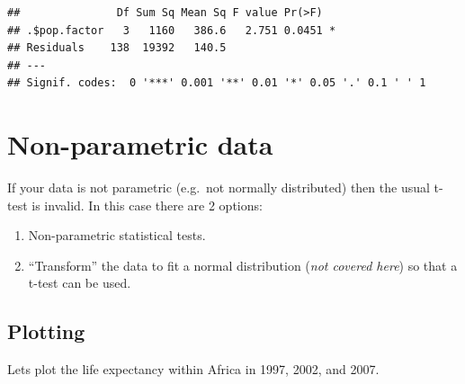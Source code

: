 \documentclass[]{book}
\makeatletter
\newenvironment{Shaded}{\begin{snugshade}}{\end{snugshade}}
\newcommand{\KeywordTok}[1]{\textcolor[rgb]{0.13,0.29,0.53}{\textbf{#1}}}
\newcommand{\DataTypeTok}[1]{\textcolor[rgb]{0.13,0.29,0.53}{#1}}
\newcommand{\DecValTok}[1]{\textcolor[rgb]{0.00,0.00,0.81}{#1}}
\newcommand{\StringTok}[1]{\textcolor[rgb]{0.31,0.60,0.02}{#1}}
\newcommand{\OperatorTok}[1]{\textcolor[rgb]{0.81,0.36,0.00}{\textbf{#1}}}
\newcommand{\NormalTok}[1]{#1}
\newenvironment{kframe}{%
\medskip{}
\setlength{\fboxsep}{.8em}
 \def\at@end@of@kframe{}%
 \ifinner\ifhmode%
  \def\at@end@of@kframe{\end{minipage}}%
  \begin{minipage}{\columnwidth}%
 \fi\fi%
 \def\FrameCommand##1{\hskip\@totalleftmargin \hskip-\fboxsep
 \colorbox{shadecolor}{##1}\hskip-\fboxsep
     \hskip-\linewidth \hskip-\@totalleftmargin \hskip\columnwidth}%
 \MakeFramed {\advance\hsize-\width
   \@totalleftmargin\z@ \linewidth\hsize
   \@setminipage}}%
 {\par\unskip\endMakeFramed%
 \at@end@of@kframe}
\renewenvironment{Shaded}{\begin{kframe}}{\end{kframe}}
\makeatother
\begin{document}
\begin{Shaded}
\end{Shaded}

\begin{verbatim}
##               Df Sum Sq Mean Sq F value Pr(>F)  
## .$pop.factor   3   1160   386.6   2.751 0.0451 *
## Residuals    138  19392   140.5                 
## ---
## Signif. codes:  0 '***' 0.001 '**' 0.01 '*' 0.05 '.' 0.1 ' ' 1
\end{verbatim}

\section{Non-parametric data}\label{non-parametric-data}

If your data is not parametric (e.g.~not normally distributed) then the
usual t-test is invalid. In this case there are 2 options:

\begin{enumerate}
\def\labelenumi{\arabic{enumi}.}
\item
  Non-parametric statistical tests.
\item
  ``Transform'' the data to fit a normal distribution (\emph{not covered
  here}) so that a t-test can be used.
\end{enumerate}

\subsection{Plotting}\label{plotting-2}

Lets plot the life expectancy within Africa in 1997, 2002, and 2007.
\end{document}
